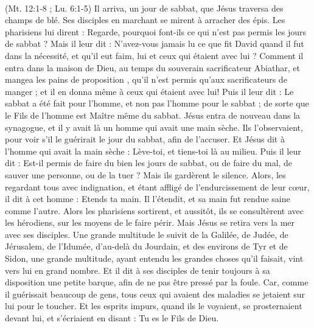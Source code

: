 \begin{multicols}{2}
{\\(Mt. 12:1-8 ; Lu. 6:1-5)}
Il arriva, un jour de sabbat, que Jésus traversa des champs de blé. Ses disciples en marchant se mirent à arracher des épis.
Les pharisiens lui dirent : Regarde, pourquoi font-ils ce qui n'est pas permis les jours de sabbat ?
Mais il leur dit : N'avez-vous jamais lu ce que fit David quand il fut dans la nécessité, et qu'il eut faim, lui et ceux qui étaient avec lui ?
Comment il entra dans la maison de Dieu, au temps du souverain sacrificateur Abiathar, et mangea les pains de proposition{} , qu’il n'est permis qu'aux sacrificateurs de manger ; et il en donna même à ceux qui étaient avec lui!
Puis il leur dit : Le sabbat a été fait pour l'homme, et non pas l'homme pour le sabbat ;
de sorte que le Fils de l'homme est Maître même du sabbat.
\VerseOne{}Jésus entra de nouveau dans la synagogue, et il y avait là un homme qui avait une main sèche.
Ils l'observaient, pour voir s'il le guérirait le jour du sabbat, afin de l'accuser.
Et Jésus dit à l'homme qui avait la main sèche : Lève-toi, et tiens-toi là au milieu.
Puis il leur dit : Est-il permis de faire du bien les jours de sabbat, ou de faire du mal, de sauver une personne, ou de la tuer ? Mais ils gardèrent le silence.
Alors, les regardant tous avec indignation, et étant affligé de l'endurcissement de leur cœur, il dit à cet homme : Etends ta main. Il l'étendit, et sa main fut rendue saine comme l'autre.
Alors les pharisiens sortirent, et aussitôt, ils se consultèrent avec les hérodiens, sur les moyens de le faire périr.
Mais Jésus se retira vers la mer avec ses disciples. Une grande multitude le suivit de la Galilée,
de Judée, de Jérusalem, de l’Idumée, d’au-delà du Jourdain, et des environs de Tyr et de Sidon, une grande multitude, ayant entendu les grandes choses qu'il faisait, vint vers lui en grand nombre.
Et il dit à ses disciples de tenir toujours à sa disposition une petite barque, afin de ne pas être pressé par la foule.
Car, comme il guérissait beaucoup de gens, tous ceux qui avaient des maladies se jetaient sur lui pour le toucher.
Et les esprits impurs, quand ils le voyaient, se prosternaient devant lui, et s'écriaient en disant : Tu es le Fils de Dieu.

\end{multicols}
